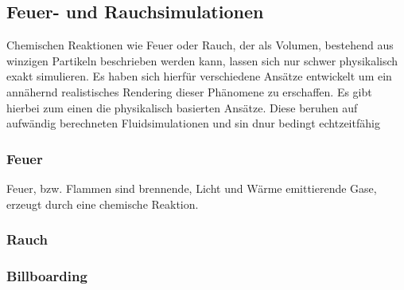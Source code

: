 \subsection{Feuer- und Rauchsimulationen}
Chemischen Reaktionen wie Feuer oder Rauch, der als Volumen, bestehend aus winzigen Partikeln beschrieben werden kann, 
lassen sich nur schwer physikalisch exakt simulieren. Es haben sich hierfür verschiedene Ansätze entwickelt um ein
annähernd realistisches Rendering dieser Phänomene zu erschaffen. Es gibt hierbei zum einen die physikalisch basierten Ansätze. 
Diese beruhen auf aufwändig berechneten Fluidsimulationen und sin dnur bedingt echtzeitfähig

\subsubsection{Feuer}
Feuer, bzw. Flammen sind brennende, Licht und Wärme emittierende Gase, erzeugt durch eine chemische Reaktion. 


\subsubsection{Rauch}

\subsubsection{Billboarding}